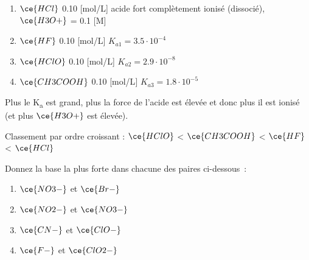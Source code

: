 \documentclass[
  11pt,
  a4paper,
  openany]{book}
\providecommand{\tightlist}{%
  \setlength{\itemsep}{0pt}\setlength{\parskip}{0pt}}
\begin{document}
\begin{Answer}

\begin{enumerate}
\def\labelenumi{\alph{enumi}.}
\tightlist
\item
  \(\ce{HCl}\) 0.10 {[}mol/L{]} \tabto{12em} acide fort complètement ionisé (dissocié), \textbar{}\(\ce{H3O+}\)\textbar{} = 0.1 {[}M{]}
  \vspace{1em}
\item
  \(\ce{HF}\) 0.10 {[}mol/L{]} \tabto{12em} \(K_{a1} = 3.5 \cdot 10^{-4}\)
  \vspace{1em}
\item
  \(\ce{HClO}\) 0.10 {[}mol/L{]} \tabto{12em} \(K_{a2} = 2.9 \cdot 10^{-8}\)
  \vspace{1em}
\item
  \(\ce{CH3COOH}\) 0.10 {[}mol/L{]} \tabto{12em} \(K_{a3} = 1.8 \cdot 10^{-5}\)
  \vspace{1em}
\end{enumerate}

Plus le K\textsubscript{a} est grand, plus la force de l'acide est élevée et donc plus il est ionisé (et plus \textbar{}\(\ce{H3O+}\)\textbar{} est élevée).

Classement par ordre croissant : \(\ce{HClO}\) \textless{} \(\ce{CH3COOH}\) \textless{} \(\ce{HF}\) \textless{} \(\ce{HCl}\)
\clearpage

\end{Answer}

\clearpage

\begin{Exercise}

Donnez la base la plus forte dans chacune des paires ci-dessous~:

\begin{enumerate}
\def\labelenumi{\alph{enumi}.}
\tightlist
\item
  \(\ce{NO3-}\) et \(\ce{Br-}\)
\item
  \(\ce{NO2-}\) et \(\ce{NO3-}\)
\item
  \(\ce{CN-}\) et \(\ce{ClO-}\)
\item
  \(\ce{F-}\) et \(\ce{ClO2-}\)
\end{enumerate}

\end{Exercise}
\end{document}
